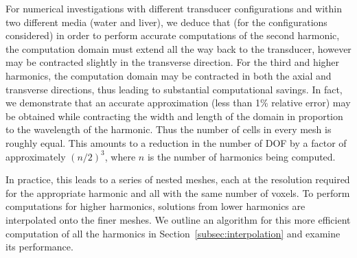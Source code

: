 \documentclass[11pt]{article}
\numberwithin{equation}{section}
\begin{document}
For numerical investigations with different transducer configurations and within 
two different media (water and liver), we deduce that (for the configurations 
considered) in order to perform accurate computations of the second harmonic, the computation 
domain must extend all the way back to the transducer, however may be contracted 
slightly in the transverse direction. For the third and higher harmonics, the 
computation domain may be contracted in both the axial and transverse directions, 
thus leading to substantial computational savings. In fact, we demonstrate that 
an accurate approximation (less than 1\% relative error) may be obtained while 
contracting the width and length
of the domain in proportion to the wavelength of the harmonic. Thus the number
of cells in every mesh is roughly equal. This amounts to a reduction in 
the number of DOF by a factor of approximately $(n/2)^3$, where $n$ is the number of harmonics 
being computed.

In practice, this leads to a series of nested meshes, each at the resolution
required for the appropriate harmonic and all with the same number of voxels.
To perform computations for higher harmonics, solutions from lower harmonics are 
interpolated onto the finer meshes. We outline an algorithm for this more 
efficient computation of all the harmonics in Section~\ref{subsec:interpolation}
and examine its performance.
\end{document}
